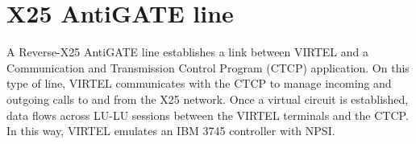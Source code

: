 \documentclass[letterpaper,10pt,english]{sphinxmanual}
\begin{document}
\begin{sphinxVerbatim}[commandchars=\\\{\}]
                     
                                     
                
                                      
                                       
                                       
                                         
    
\end{sphinxVerbatim}


\newpage

\ignorespaces 

\section{X25 AntiGATE line}
\label{\detokenize{connectivity_guide:x25-antigate-line}}\label{\detokenize{connectivity_guide:index-74}}
A Reverse-X25 AntiGATE line establishes a link between VIRTEL and a Communication and Transmission Control Program (CTCP) application. On this type of line, VIRTEL communicates with the CTCP to manage incoming and outgoing calls to and from the X25 network. Once a virtual circuit is established, data flows across LU-LU sessions between the VIRTEL terminals and the CTCP. In this way, VIRTEL emulates an IBM 3745 controller with NPSI.


\ignorespaces 
\end{document}
